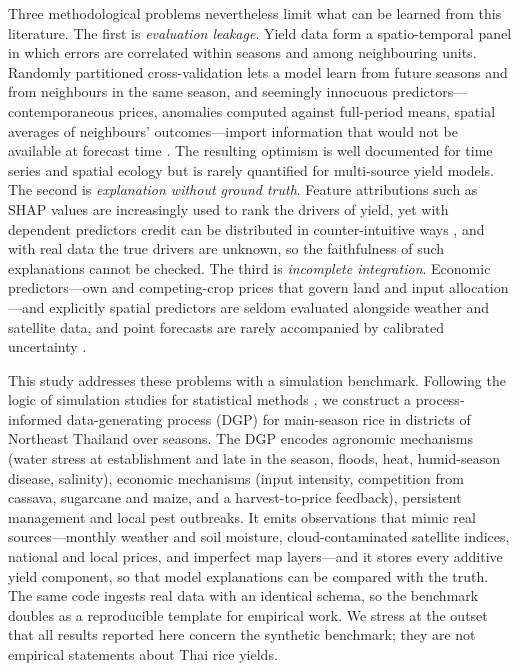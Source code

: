 Three methodological problems nevertheless limit what can be learned from this literature. The first is \emph{evaluation leakage}. Yield data form a spatio-temporal panel in which errors are correlated within seasons and among neighbouring units. Randomly partitioned cross-validation lets a model learn from future seasons and from neighbours in the same season, and seemingly innocuous predictors---contemporaneous prices, anomalies computed against full-period means, spatial averages of neighbours' outcomes---import information that would not be available at forecast time \citep{kaufman2012leakage,roberts2017cross,kapoor2023leakage}. The resulting optimism is well documented for time series and spatial ecology \citep{tashman2000out,bergmeir2012use,roberts2017cross} but is rarely quantified for multi-source yield models. The second is \emph{explanation without ground truth}. Feature attributions such as SHAP values \citep{lundberg2017unified,lundberg2020local} are increasingly used to rank the drivers of yield, yet with dependent predictors credit can be distributed in counter-intuitive ways \citep{aas2021explaining,hooker2021unrestricted}, and with real data the true drivers are unknown, so the faithfulness of such explanations cannot be checked. The third is \emph{incomplete integration}. Economic predictors---own and competing-crop prices that govern land and input allocation \citep{nerlove1956estimates}---and explicitly spatial predictors are seldom evaluated alongside weather and satellite data, and point forecasts are rarely accompanied by calibrated uncertainty \citep{vovk2005algorithmic,lei2018distribution}.

This study addresses these problems with a simulation benchmark. Following the logic of simulation studies for statistical methods \citep{morris2019using}, we construct a process-informed data-generating process (DGP) for main-season rice in \nDistricts{} districts of Northeast Thailand over \nSeasons{} seasons. The DGP encodes agronomic mechanisms (water stress at establishment and late in the season, floods, heat, humid-season disease, salinity), economic mechanisms (input intensity, competition from cassava, sugarcane and maize, and a harvest-to-price feedback), persistent management and local pest outbreaks. It emits observations that mimic real sources---monthly weather and soil moisture, cloud-contaminated satellite indices, national and local prices, and imperfect map layers---and it stores every additive yield component, so that model explanations can be compared with the truth. The same code ingests real data with an identical schema, so the benchmark doubles as a reproducible template for empirical work. We stress at the outset that all results reported here concern the synthetic benchmark; they are not empirical statements about Thai rice yields.

